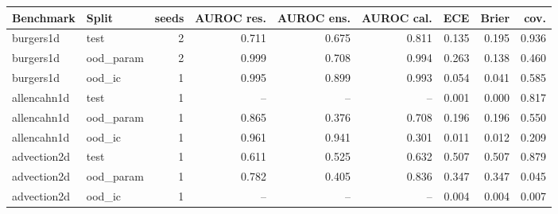 \begin{tabular}{llrrrrrrr}
\toprule
Benchmark & Split & seeds & AUROC res. & AUROC ens. & AUROC cal. & ECE & Brier & cov. \\
\midrule
burgers1d & test & 2 & 0.711 & 0.675 & 0.811 & 0.135 & 0.195 & 0.936 \\
burgers1d & ood\_param & 2 & 0.999 & 0.708 & 0.994 & 0.263 & 0.138 & 0.460 \\
burgers1d & ood\_ic & 1 & 0.995 & 0.899 & 0.993 & 0.054 & 0.041 & 0.585 \\
allencahn1d & test & 1 & -- & -- & -- & 0.001 & 0.000 & 0.817 \\
allencahn1d & ood\_param & 1 & 0.865 & 0.376 & 0.708 & 0.196 & 0.196 & 0.550 \\
allencahn1d & ood\_ic & 1 & 0.961 & 0.941 & 0.301 & 0.011 & 0.012 & 0.209 \\
advection2d & test & 1 & 0.611 & 0.525 & 0.632 & 0.507 & 0.507 & 0.879 \\
advection2d & ood\_param & 1 & 0.782 & 0.405 & 0.836 & 0.347 & 0.347 & 0.045 \\
advection2d & ood\_ic & 1 & -- & -- & -- & 0.004 & 0.004 & 0.007 \\
\bottomrule
\end{tabular}
